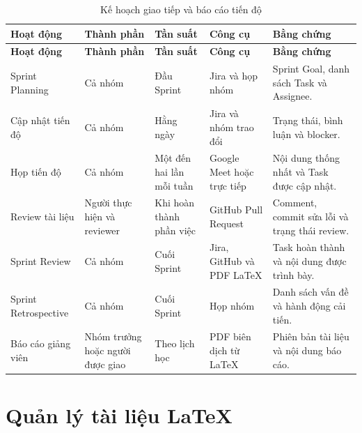 \begin{longtable}{
		|p{3.3cm}
		|p{2.8cm}
		|p{2.5cm}
		|p{2.8cm}
		|p{3.6cm}|
	}
	\caption{Kế hoạch giao tiếp và báo cáo tiến độ}
	\label{tab:communication-plan}\\
	\hline
	\textbf{Hoạt động} &
	\textbf{Thành phần} &
	\textbf{Tần suất} &
	\textbf{Công cụ} &
	\textbf{Bằng chứng} \\
	\hline
	\endfirsthead
	
	\hline
	\textbf{Hoạt động} &
	\textbf{Thành phần} &
	\textbf{Tần suất} &
	\textbf{Công cụ} &
	\textbf{Bằng chứng} \\
	\hline
	\endhead
	
	Sprint Planning &
	Cả nhóm &
	Đầu Sprint &
	Jira và họp nhóm &
	Sprint Goal, danh sách Task và Assignee. \\
	\hline
	
	Cập nhật tiến độ &
	Cả nhóm &
	Hằng ngày &
	Jira và nhóm trao đổi &
	Trạng thái, bình luận và blocker. \\
	\hline
	
	Họp tiến độ &
	Cả nhóm &
	Một đến hai lần mỗi tuần &
	Google Meet hoặc trực tiếp &
	Nội dung thống nhất và Task được cập nhật. \\
	\hline
	
	Review tài liệu &
	Người thực hiện và reviewer &
	Khi hoàn thành phần việc &
	GitHub Pull Request &
	Comment, commit sửa lỗi và trạng thái review. \\
	\hline
	
	Sprint Review &
	Cả nhóm &
	Cuối Sprint &
	Jira, GitHub và PDF LaTeX &
	Task hoàn thành và nội dung được trình bày. \\
	\hline
	
	Sprint Retrospective &
	Cả nhóm &
	Cuối Sprint &
	Họp nhóm &
	Danh sách vấn đề và hành động cải tiến. \\
	\hline
	
	Báo cáo giảng viên &
	Nhóm trưởng hoặc người được giao &
	Theo lịch học &
	PDF biên dịch từ LaTeX &
	Phiên bản tài liệu và nội dung báo cáo. \\
	\hline
	
\end{longtable}

\section{Quản lý tài liệu LaTeX}

